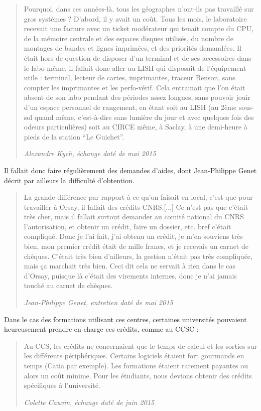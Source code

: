 \blockquote[\textit{Alexandre Kych, échange daté de mai 2015}]{Pourquoi, dans ces années-là, tous les géographes n'ont-ils pas travaillé sur gros systèmes ? D'abord, il y avait un coût. Tous les mois, le laboratoire recevait une facture avec un ticket modérateur qui tenait compte du CPU, de la mémoire centrale et des espaces disques utilisés, du nombre de montages de bandes et lignes imprimées, et des priorités demandées. Il était hors de question de disposer d'un terminal et de ses accessoires dans le labo même, il fallait donc aller au LISH qui disposait de l'équipement utile : terminal, lecteur de cartes, imprimantes, traceur Benson, sans compter les imprimantes et les perfo-vérif. Cela entrainait que l'on était absent de son labo pendant des périodes assez longues, sans pouvoir jouir d'un espace personnel de rangement, en étant soit au LISH (au 2ème sous-sol quand même, c'est-à-dire sans lumière du jour et avec quelques fois des odeurs particulières) soit au CIRCE même, à Saclay, à une demi-heure à pieds de la station \enquote{Le Guichet}.}

Il fallait donc faire régulièrement des demandes d'aides, dont Jean-Philippe Genet décrit par ailleurs la difficulté d'obtention.

\blockquote[\textit{Jean-Philippe Genet, entretien daté de mai 2015}]{La grande différence par rapport à ce qu'on faisait en local, c'est que pour travailler à Orsay, il fallait des crédits CNRS.[...] Ce n’est pas que c'était très cher, mais il fallait surtout demander au comité national du CNRS l'autorisation, et obtenir un crédit, faire un dossier, etc. bref c'était compliqué. Donc je l'ai fait, j'ai obtenu un crédit, je m'en souviens très bien, mon premier crédit était de mille francs, et je recevais un carnet de chèques. C'était très bien d'ailleurs, la gestion n'était pas très compliquée, mais ça marchait très bien. Ceci dit cela ne servait à rien dans le cas d'Orsay, puisque là c'était des virements internes, donc je n’ai jamais touché au carnet de chèques.}

Dans le cas des formations utilisant ces centres, certaines universités pouvaient heureusement prendre en charge ces crédits, comme au CCSC :

\blockquote[\textit{Colette Cauvin, échange daté de juin 2015}]{Au CCS, les crédits ne concernaient que le temps de calcul et les sorties sur les différents périphériques. Certains logiciels étaient fort gourmands en temps (Catia par exemple). Les formations étaient rarement payantes ou alors un coût minime. Pour les étudiants, nous devions obtenir des crédits spécifiques à l’université.}

